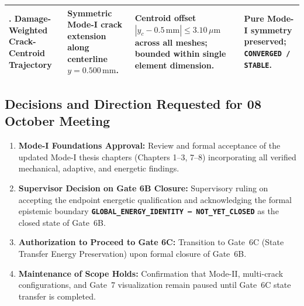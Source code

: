 \begin{table}[htbp]
\begin{tabularx}{\textwidth}{p{2.2cm}p{3.8cm}p{4.2cm}X}
\addlinespace
10. Damage-Weighted Crack-Centroid Trajectory & Symmetric Mode-I crack extension along centerline $y = 0.500\,\mathrm{mm}$. & Centroid offset $|y_c - 0.5\,\mathrm{mm}| \le 3.10\,\mu\mathrm{m}$ across all meshes; bounded within single element dimension. & Pure Mode-I symmetry preserved; \textbf{\texttt{CONVERGED / STABLE}}. \\
\bottomrule
\end{tabularx}
\end{table}

\subsection{Decisions and Direction Requested for 08 October Meeting}
\begin{enumerate}
  \item \textbf{Mode-I Foundations Approval:} Review and formal acceptance of the updated Mode-I thesis chapters (Chapters 1--3, 7--8) incorporating all verified mechanical, adaptive, and energetic findings.
  \item \textbf{Supervisor Decision on Gate 6B Closure:} Supervisory ruling on accepting the endpoint energetic qualification and acknowledging the formal epistemic boundary \textbf{\texttt{GLOBAL\_ENERGY\_IDENTITY --- NOT\_YET\_CLOSED}} as the closed state of Gate~6B.
  \item \textbf{Authorization to Proceed to Gate 6C:} Transition to Gate~6C (State Transfer Energy Preservation) upon formal closure of Gate~6B.
  \item \textbf{Maintenance of Scope Holds:} Confirmation that Mode-II, multi-crack configurations, and Gate~7 visualization remain paused until Gate~6C state transfer is completed.
\end{enumerate}
